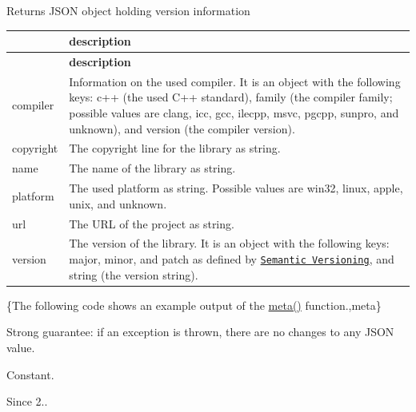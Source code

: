 \begin{DoxyReturn}{Returns}
J\+S\+ON object holding version information \tabulinesep=1mm
\begin{longtabu} spread 0pt [c]{*2{|X[-1]}|}
\hline
{}&{\bf description  }\\
\endfirsthead
\hline
\endfoot
\hline
{}&{\bf description  }\\
\endhead
{\ttfamily compiler} &Information on the used compiler. It is an object with the following keys\+: {\ttfamily c++} (the used C++ standard), {\ttfamily family} (the compiler family; possible values are {\ttfamily clang}, {\ttfamily icc}, {\ttfamily gcc}, {\ttfamily ilecpp}, {\ttfamily msvc}, {\ttfamily pgcpp}, {\ttfamily sunpro}, and {\ttfamily unknown}), and {\ttfamily version} (the compiler version). \\
{\ttfamily copyright} &The copyright line for the library as string. \\
{\ttfamily name} &The name of the library as string. \\
{\ttfamily platform} &The used platform as string. Possible values are {\ttfamily win32}, {\ttfamily linux}, {\ttfamily apple}, {\ttfamily unix}, and {\ttfamily unknown}. \\
{\ttfamily url} &The U\+RL of the project as string. \\
{\ttfamily version} &The version of the library. It is an object with the following keys\+: {\ttfamily major}, {\ttfamily minor}, and {\ttfamily patch} as defined by \href{http://semver.org}{\tt Semantic Versioning}, and {\ttfamily string} (the version string). \\
\end{longtabu}
\{The following code shows an example output of the {\ttfamily \hyperlink{classnlohmann_1_1basic__json_a351b4f65014f6c2b8b2832847d44bbd7}{meta()}} function.,meta\}
\end{DoxyReturn}
Strong guarantee\+: if an exception is thrown, there are no changes to any J\+S\+ON value.

Constant.

\begin{DoxySince}{Since}
2.. 
\end{DoxySince}
